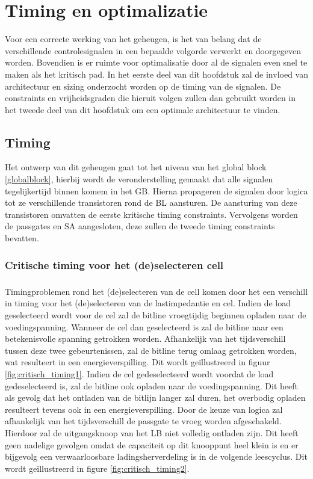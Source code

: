 \chapter{Timing en optimalizatie}
\label{timing-optimization}
Voor een correcte werking van het geheugen, is het van belang dat de verschillende controlesignalen in een bepaalde volgorde verwerkt en doorgegeven worden.
Bovendien is er ruimte voor optimalisatie door al de signalen even snel te maken als het kritisch pad. In het eerste deel van dit hoofdstuk zal de invloed van architectuur en sizing onderzocht worden op de timing van de signalen. De constraints en vrijheidsgraden die hieruit volgen zullen dan gebruikt worden in het tweede deel van dit hoofdstuk om een optimale architectuur te vinden.

\section{Timing}
\label{timing}
Het ontwerp van dit geheugen gaat tot het niveau van het global block \ref{globalblock}, hierbij wordt de veronderstelling gemaakt dat alle signalen tegelijkertijd binnen komem in het GB. Hierna propageren de signalen door logica tot ze verschillende transistoren rond de BL aansturen. De aansturing van deze transistoren omvatten de eerste kritische timing constraints. Vervolgens worden de passgates en SA aangesloten, deze zullen de tweede timing constraints bevatten.

\subsection{Critische timing voor het (de)selecteren cell}
\paragraph{}
Timingproblemen rond het (de)selecteren van de cell komen door het een verschill in timing voor het (de)selecteren van de lastimpedantie en cel. Indien de load geselecteerd wordt voor de cel zal de bitline vroegtijdig beginnen opladen naar de voedingspanning. Wanneer de cel dan geselecteerd is zal de bitline naar een betekenisvolle spanning getrokken worden. Afhankelijk van het tijdsverschill tussen deze twee gebeurtenissen, zal de bitline terug omlaag getrokken worden, wat resulteert in een energieverspilling. Dit wordt geïllustreerd in figuur \ref{fig:critisch_timing1}. Indien de cel gedeselecteerd wordt voordat de load gedeselecteerd is, zal de bitline ook opladen naar de voedingspanning. Dit heeft als gevolg dat het ontladen van de bitlijn langer zal duren, het overbodig opladen resulteert tevens ook in een energieverspilling. Door de keuze van logica zal afhankelijk van het tijdsverschill de passgate te vroeg worden afgeschakeld. Hierdoor zal de uitgangsknoop van het LB niet volledig ontladen zijn. Dit heeft geen nadelige gevolgen omdat de capaciteit op dit knooppunt heel klein is en er bijgevolg een verwaarloosbare ladingsherverdeling is in de volgende leescyclus. Dit wordt geïllustreerd in figure \ref{fig:critisch_timing2}.  


